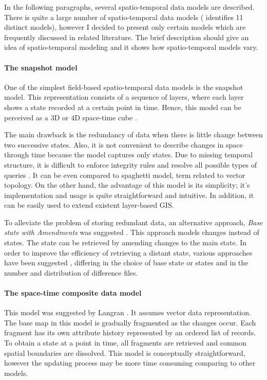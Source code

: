 \documentclass[a4paper,12pt]{book}
\begin{document}
In the following paragraphs, several spatio-temporal data models are described.
There is quite a large number of spatio-temporal data models (\cite{pelekis2004} identifies 11 distinct models), however
I decided to present only certain models which are frequently discussed in related literature.
The brief description should give an idea of spatio-temporal modeling
and it shows how spatio-temporal models vary.

\paragraph*{The snapshot model}
One of the simplest field-based spatio-temporal data models is the snapshot model.
This representation consists of a sequence of layers,
where each layer shows a state recorded at a certain point in time.
Hence, this model can be perceived as a 3D or 4D space-time cube \cite{peuquet2001}.


The main drawback is the redundancy of data when there is little change between two successive states.
Also, it is not convenient to describe changes in space through time because the model captures only states.
Due to missing temporal structure, it is difficult to enforce integrity rules
and resolve all possible types of queries \cite{pelekis2004}.
It can be even compared to spaghetti model, term related to vector topology.
On the other hand, the advantage of this model is its simplicity;
it's implementation and usage is quite straightforward and intuitive.
In addition, it can be easily used to extend existent layer-based GIS.

To alleviate the problem of storing redundant data, an alternative approach,
\emph{Base state with Amendments} was suggested \cite{langran1988}.
This approach models changes instead of states.
The state can be retrieved by amending changes to the main state.
In order to improve the efficiency of retrieving a distant state,
various approaches have been suggested \cite{wang2012},
differing in the choice of base state or states and in the number and distribution of difference files.

\paragraph*{The space-time composite data model}
This model was suggested by Langran \cite{langran1988}. It assumes vector data representation.
The base map in this model is gradually fragmented as the changes occur.
Each fragment has its own attribute history represented by an ordered list of records.
To obtain a state at a point in time, all fragments are retrieved and common spatial boundaries are dissolved.
This model is conceptually straightforward, however the updating process may be more time consuming \cite{pelekis2004}
comparing to other models.
\end{document}
